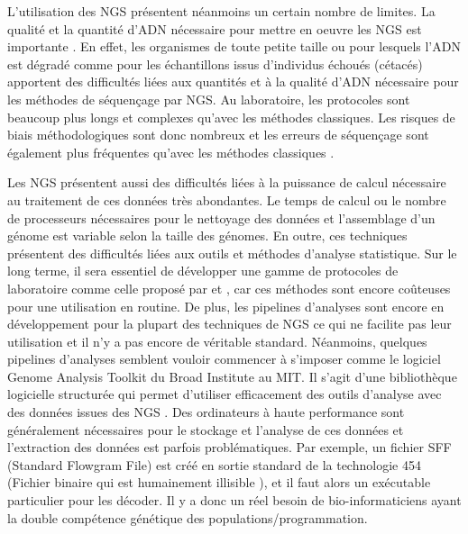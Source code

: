 \documentclass[a4paper,12pt,twoside]{article}\usepackage[]{graphicx}\usepackage[]{color}
\begin{document}
\begin {bibunit} [newbst]
\begin{enca}
{}



		
\end{enca}

L'utilisation des NGS présentent néanmoins un certain nombre de limites. La qualité et la quantité d'ADN nécessaire pour mettre en oeuvre les NGS est importante \cite{davey2011genome}. En effet, les organismes de toute petite taille \citep{baily1992detection} ou pour lesquels l'ADN est dégradé comme pour les échantillons issus d'individus échoués (cétacés) \citep{taberlet2012towards, templeton2013dna} apportent des difficultés liées aux quantités et à la qualité d'ADN nécessaire pour les méthodes de séquençage par NGS. Au laboratoire, les protocoles sont beaucoup plus longs et complexes qu'avec les méthodes classiques. Les risques de biais méthodologiques sont donc nombreux \citep[voir par exemple][]{bonin2004aa, baird2008aa, peterson2012double, hohenlohe2012extensive, niu2010artificial, gomez2009systematic,haas2011chimeric} et les erreurs de séquençage sont également plus fréquentes qu'avec les méthodes classiques \citep{mastretta2015restriction, shendure2008next}.

Les NGS présentent aussi des difficultés liées à la puissance de calcul nécessaire au traitement de ces données très abondantes. Le temps de calcul ou le nombre de processeurs nécessaires pour le nettoyage des données et l'assemblage d'un génome est variable selon la taille des génomes. En outre, ces techniques présentent des difficultés liées aux outils et méthodes d'analyse statistique.  Sur le long terme, il sera essentiel de développer une gamme de protocoles de laboratoire comme celle proposé par \citet{zielinski2014development} et \citet{lighten2014aa}, car ces méthodes sont encore coûteuses pour une utilisation en routine. De plus, les pipelines d'analyses sont encore en développement pour la plupart des techniques de NGS \citep{lighten2014aa} ce qui ne facilite pas leur utilisation et il n'y a pas encore de véritable standard. Néanmoins, quelques pipelines d'analyses semblent vouloir commencer à s'imposer comme le logiciel Genome Analysis Toolkit du Broad Institute au MIT. Il s'agit d'une bibliothèque logicielle structurée qui permet d'utiliser efficacement des outils d'analyse avec des données issues des NGS \citep{lam2012detecting}. Des ordinateurs à haute performance sont généralement nécessaires pour le stockage et l'analyse de ces données \citep{shafer2015genomics, garner2015genomics} et l'extraction des données est parfois problématiques. Par exemple, un fichier SFF (Standard Flowgram File) est créé en sortie standard de la technologie 454 (Fichier binaire qui est humainement illisible \citealp{peyretaillade2011extreme}), et il faut alors un exécutable particulier pour les décoder. Il y a donc un réel besoin de bio-informaticiens ayant la double compétence génétique des populations/programmation.


\end{bibunit}
\end{document}
